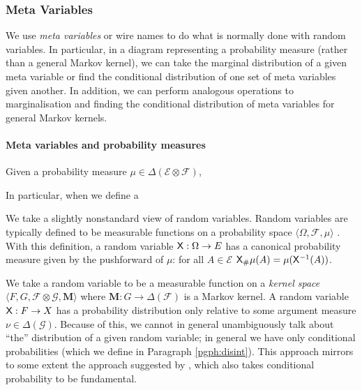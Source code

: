 \subsubsection{Meta Variables}\label{par:random_variables}

We use \emph{meta variables} or wire names to do what is normally done with random variables. In particular, in a diagram representing a probability measure (rather than a general Markov kernel), we can take the marginal distribution of a given meta variable or find the conditional distribution of one set of meta variables given another. In addition, we can perform analogous operations to marginalisation and finding the conditional distribution of meta variables for general Markov kernels.

\paragraph{Meta variables and probability measures}

Given a probability measure $\mu\in \Delta(\mathcal{E}\otimes\mathcal{F})$, 

In particular, when we define a 

We take a slightly nonstandard view of random variables. Random variables are typically defined to be measurable functions on a probability space $\langle \Omega, \mathcal{F}, \mu\rangle$ \citep{cinlar_probability_2011}. With this definition, a random variable $\mathsf{X}:\Omega\to E$ has a canonical probability measure given by the pushforward of $\mu$: for all $A\in\mathscr{E}$ $\mathsf{X}_\# \mu(A) = \mu(\mathsf{X}^{-1}(A))$.

We take a random variable to be a measurable function on a \emph{kernel space} $\langle F, G, \mathcal{F}\otimes\mathcal{G},\mathbf{M}\rangle$ where $\mathbf{M}:G\to \Delta(\mathcal{F})$ is a Markov kernel. A random variable $\mathsf{X}:F\to X$ has a probability distribution only relative to some argument measure $\nu\in\Delta(\mathcal{G})$. Because of this, we cannot in general unambiguously talk about ``the'' distribution of a given random variable; in general we have only conditional probabilities (which we define in Paragraph \ref{pgph:disint}). This approach mirrors to some extent the approach suggested by \citet{hajek_what_2003}, which also takes conditional probability to be fundamental.


